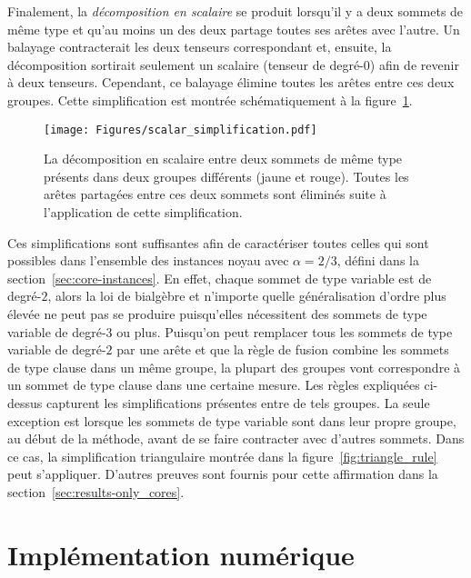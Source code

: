Finalement, la \emph{décomposition en scalaire} se produit lorsqu'il y a deux sommets de même type et qu'au moins un des deux partage toutes ses arêtes avec l'autre.
Un balayage contracterait les deux tenseurs correspondant et, ensuite, la décomposition sortirait seulement un scalaire (tenseur de degré-$0$) afin de revenir à deux tenseurs.
Cependant, ce balayage élimine toutes les arêtes entre ces deux groupes.
Cette simplification est montrée schématiquement à la figure~\ref{fig:scalar-decomposition}.
\begin{figure}[h]
    \centering
    \texttt{[image: Figures/scalar\_simplification.pdf]}
    \caption{La décomposition en scalaire entre deux sommets de même type présents dans deux groupes différents (jaune et rouge). Toutes les arêtes partagées entre ces deux sommets sont éliminés suite à l'application de cette simplification.}
    \label{fig:scalar-decomposition}
\end{figure}

Ces simplifications sont suffisantes afin de caractériser toutes celles qui sont possibles dans l'ensemble des instances noyau avec $\alpha = 2/3$, défini dans la section~\ref{sec:core-instances}.
En effet, chaque sommet de type variable est de degré-$2$, alors la loi de bialgèbre et n'importe quelle généralisation d'ordre plus élevée ne peut pas se produire puisqu'elles nécessitent des sommets de type variable de degré-$3$ ou plus.
Puisqu'on peut remplacer tous les sommets de type variable de degré-$2$ par une arête et que la règle de fusion combine les sommets de type clause dans un même groupe, la plupart des groupes vont correspondre à un sommet de type clause dans une certaine mesure.
Les règles expliquées ci-dessus capturent les simplifications présentes entre de tels groupes.
La seule exception est lorsque les sommets de type variable sont dans leur propre groupe, au début de la méthode, avant de se faire contracter avec d'autres sommets.
Dans ce cas, la simplification triangulaire montrée dans la figure~\ref{fig:triangle_rule} peut s'appliquer.
D'autres preuves sont fournis pour cette affirmation dans la section~\ref{sec:results-only_cores}.



\chapter{Implémentation numérique}\label{ch:numerical-implementation}

